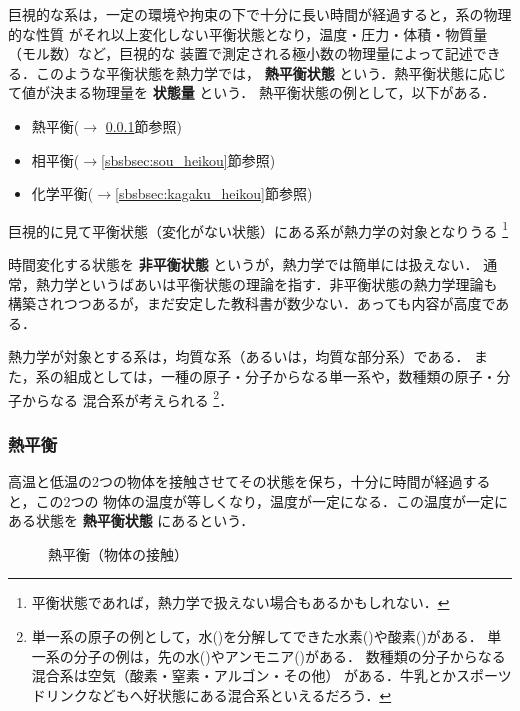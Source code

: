         巨視的な系は，一定の環境や拘束の下で十分に長い時間が経過すると，系の物理的な性質
        がそれ以上変化しない平衡状態となり，温度・圧力・体積・物質量（モル数）など，巨視的な
        装置で測定される極小数の物理量によって記述できる．このような平衡状態を熱力学では，
        \textbf{熱平衡状態} という．熱平衡状態に応じて値が決まる物理量を \textbf{状態量} という．
        熱平衡状態の例として，以下がある．
        \begin{itemize}
            \item 熱平衡($\rightarrow$ \ref{sbsbsec:netsu_heikou}節参照)
            \item 相平衡($\rightarrow$\ref{sbsbsec:sou_heikou}節参照)
            \item 化学平衡($\rightarrow$\ref{sbsbsec:kagaku_heikou}節参照)
        \end{itemize}

        巨視的に見て平衡状態（変化がない状態）にある系が熱力学の対象となりうる
            \footnote{
                平衡状態であれば，熱力学で扱えない場合もあるかもしれない．
            }

        時間変化する状態を \textbf{非平衡状態} というが，熱力学では簡単には扱えない．
        通常，熱力学というばあいは平衡状態の理論を指す．非平衡状態の熱力学理論も
        構築されつつあるが，まだ安定した教科書が数少ない．あっても内容が高度である．

        熱力学が対象とする系は，均質な系（あるいは，均質な部分系）である．
        また，系の組成としては，一種の原子・分子からなる単一系や，数種類の原子・分子からなる
        混合系が考えられる
            \footnote{
                単一系の原子の例として，水()を分解してできた水素()や酸素()がある．
                単一系の分子の例は，先の水()やアンモニア()がある．
                数種類の分子からなる混合系は空気（酸素・窒素・アルゴン・その他）
                がある．牛乳とかスポーツドリンクなどもへ好状態にある混合系といえるだろう．
            }．

        \subsubsection{熱平衡}\label{sbsbsec:netsu_heikou}
        高温と低温の2つの物体を接触させてその状態を保ち，十分に時間が経過すると，この2つの
        物体の温度が等しくなり，温度が一定になる．この温度が一定にある状態を \textbf{熱平衡状態} にあるという．
        \begin{figure}[hbt]
            \begin{center}
                \caption{熱平衡（物体の接触）}
                \label{fig:netsu_heikou}
            \end{center}
        \end{figure}

